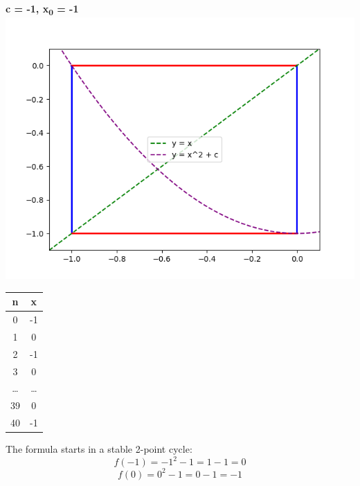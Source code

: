 \documentclass{article}
\begin{document}
\newpage
\begin{center}
    \textbf{c = -1, x\textsubscript{0} = -1}
    \includegraphics[scale=0.8]{5}
    \begin{tabular}{| c | c |}
        \hline
        n & x\\
        \hline
        0 & -1\\
        1 & 0\\
        2 & -1\\
        3 & 0\\
        \dots & \dots \\ 
        39 & 0\\
        40 &  -1\\
        \hline
    \end{tabular}
    \end{center}
The formula starts in a stable 2-point cycle:
\[
f(-1) = -1^{2} - 1 = 1 - 1 = 0 
\]
\[
f(0) = 0^{2} - 1 = 0 - 1 = -1 
\]
\end{document}
